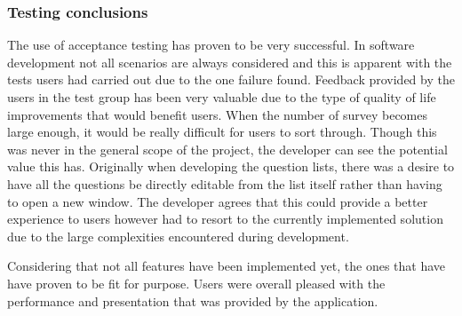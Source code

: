 \subsubsection*{Testing conclusions}
The use of acceptance testing has proven to be very successful.
In software development not all scenarios are always considered and this is apparent with the tests users had carried out due to the one failure 
found.
Feedback provided by the users in the test group has been very valuable due to the type of quality of life improvements that would benefit users.
When the number of survey becomes large enough, it would be really difficult for users to sort through. 
Though this was never in the general scope of the project, the developer can see the potential value this has.
Originally when developing the question lists, there was a desire to have all the questions be directly editable from the list itself rather than
having to open a new window. 
The developer agrees that this could provide a better experience to users however had to resort to the currently implemented solution due to the 
large complexities encountered during development.

Considering that not all features have been implemented yet, the ones that have have proven to be fit for purpose.
Users were overall pleased with the performance and presentation that was provided by the application.